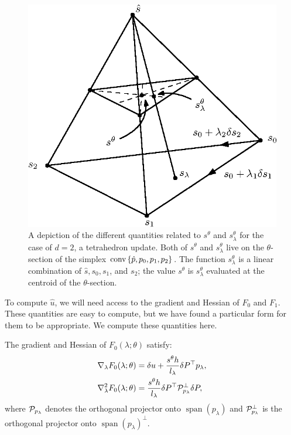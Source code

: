 \documentclass[eikonal.tex]{subfiles}
\begin{document}
\begin{figure}
  \centering
  \includegraphics{speed-tetra.eps}
  \caption{A depiction of the different quantities related to
    $s^{\theta}$ and $s^{\theta}_\lambda$ for the case of $d = 2$, a
    tetrahedron update. Both of $s^\theta$ and $s^\theta_\lambda$ live
    on the $\theta$-section of the simplex
    $\operatorname{conv} \left\{\hat{p}, p_0, p_1, p_2\right\}$. The function
    $s^\theta_\lambda$ is a linear combination of $\hat{s}, s_0, s_1$,
    and $s_2$; the value $s^\theta$ is $s^\theta_\lambda$ evaluated at
    the centroid of the $\theta$-section.}
\end{figure}

To compute $\hat{u}$, we will need access to the gradient and Hessian
of $F_0$ and $F_1$. These quantities are easy to compute, but we have
found a particular form for them to be appropriate. We compute these
quantities here.

\begin{lemma}\label{lemma:F0-grad-and-Hess}
  The gradient and Hessian of $F_0(\lambda; \theta)$ satisfy:
  \begin{align}
    \nabla_\lambda F_0(\lambda; \theta) &= \delta u + \frac{s^{\theta} h}{l_\lambda} \delta P^\top p_\lambda, \\
    \nabla^2_\lambda F_0(\lambda; \theta) &= \frac{s^{\theta} h}{l_\lambda} \delta P^\top \mathcal{P}^\perp_{p_\lambda} \delta P,
  \end{align}
  where $\mathcal{P}_{p_\lambda}$ denotes the orthogonal projector onto
  $\operatorname{span}(p_\lambda)$ and $\mathcal{P}_{p_\lambda}^\perp$ is
  the orthogonal projector onto
  $\operatorname{span}(p_\lambda)^\perp$.
\end{lemma}
\end{document}
